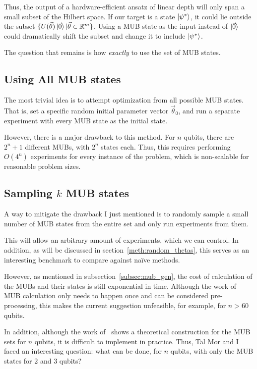 \documentclass[a4paper,12pt]{article}
\newcommand{\thetas}{\vec{\theta}}
\begin{document}
Thus, the output of a hardware-efficient ansatz of linear depth will only span a small subset of the Hilbert space.
If our target is a state $\ket{\psi^*}$, it could lie outside the subset $\{U(\thetas)\ket{\vec{0}} | \thetas \in \mathbb{R}^m\}$. Using a MUB state as the input instead of $\ket{\vec{0}}$ could dramatically shift the subset and change it to include $\ket{\psi^*}$.

\medskip
The question that remains is how \emph{exactly} to use the set of MUB states.

\subsection{Using All MUB states} \label{meth:all_mub}
The most trivial idea is to attempt optimization from all possible MUB states.
That is, set a specific random initial parameter vector $\thetas_0$, and run a separate experiment with every MUB state as the initial state.

However, there is a major drawback to this method.
For $n$ qubits, there are $2^n+1$ different MUBs, with $2^n$ states each.
Thus, this requires performing $O(4^n)$ experiments for every instance of the problem, which is non-scalable for reasonable problem sizes.

\subsection{Sampling $k$ MUB states} \label{meth:k_mub}
A way to mitigate the drawback I just mentioned is to randomly sample a small number of MUB states from the entire set and only run experiments from them.

This will allow an arbitrary amount of experiments, which we can control.
In addition, as will be discussed in section~\ref{meth:random_thetas}, this serves as an interesting benchmark to compare against na{\"i}ve methods.

However, as mentioned in subsection~\ref{subsec:mub_gen}, the cost of calculation of the MUBs and their states is still exponential in time. Although the work of MUB calculation only needs to happen once and can be considered pre-processing, this makes the current suggestion unfeasible, for example, for $n>60$ qubits.

In addition, although the work of~\cite{bandyopadhyay_new_2002} shows a theoretical construction for the MUB sets for $n$ qubits, it is difficult to implement in practice.
Thus, Tal Mor and I faced an interesting question: what can be done, for $n$ qubits, with only the MUB states for 2 and 3 qubits?
\end{document}

